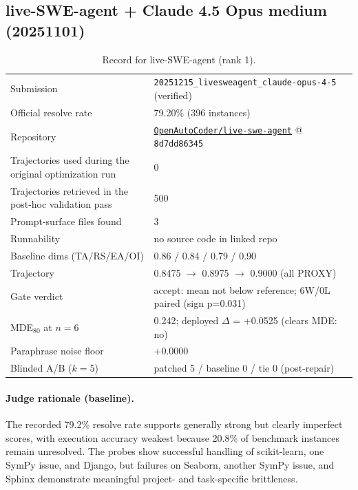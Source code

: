 \subsection{live-SWE-agent + Claude 4.5 Opus medium (20251101)}
\label{app:agent1}
\begin{table}[h]\centering\scriptsize
\caption{Record for live-SWE-agent (rank 1).}
\begin{tabular}{lp{8.2cm}}\toprule
Submission & \texttt{20251215\_\allowbreak{}livesweagent\_\allowbreak{}claude-opus-4-5} (verified) \\
Official resolve rate & 79.20\% (396 instances) \\
Repository & \href{https://github.com/OpenAutoCoder/live-swe-agent}{\texttt{OpenAutoCoder/live-swe-agent}} @ \texttt{8d7dd86345} \\
Trajectories used during the original optimization run & 0 \\
Trajectories retrieved in the post-hoc validation pass & 500 \\
Prompt-surface files found & 3 \\
Runnability & no source code in linked repo \\
Baseline dims (TA/RS/EA/OI) & 0.86 / 0.84 / 0.79 / 0.90 \\
Trajectory & 0.8475 $\to$ 0.8975 $\to$ 0.9000 (all PROXY) \\
Gate verdict & accept: mean not below reference; 6W/0L paired (sign p=0.031) \\
MDE$_{80}$ at $n{=}6$ & 0.242; deployed $\Delta$ = +0.0525 (clears MDE: no) \\
Paraphrase noise floor & +0.0000 \\
Blinded A/B ($k{=}5$) & patched 5 / baseline 0 / tie 0 (post-repair) \\
\bottomrule\end{tabular}\end{table}
\paragraph{Judge rationale (baseline).}
The recorded 79.2\% resolve rate supports generally strong but clearly imperfect scores, with execution accuracy weakest because 20.8\% of benchmark instances remain unresolved. The probes show successful handling of scikit-learn, one SymPy issue, and Django, but failures on Seaborn, another SymPy issue, and Sphinx demonstrate meaningful project- and task-specific brittleness.

